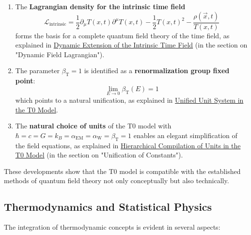 \documentclass[12pt,a4paper]{article}
\newcommand{\Tfieldt}{T(x,t)}
\newcommand{\alphaEM}{\alpha_{\text{EM}}}
\newcommand{\alphaW}{\alpha_{\text{W}}}
\newcommand{\betaT}{\beta_{\text{T}}}
\newcommand{\vecx}{\vec{x}}
\begin{document}
	\begin{enumerate}
		\item The \textbf{Lagrangian density for the intrinsic time field}
		\begin{equation}
			\mathcal{L}_{\text{intrinsic}} = \frac{1}{2}\partial_{\mu}\Tfieldt\partial^{\mu}\Tfieldt - \frac{1}{2}\Tfieldt^2 - \frac{\rho(\vecx,t)}{\Tfieldt}
		\end{equation}
		forms the basis for a complete quantum field theory of the time field, as explained in \href{https://github.com/jpascher/T0-Time-Mass-Duality/tree/main/2/pdf/English/DynamicTF-SchrodingerExtensions_En.pdf}{Dynamic Extension of the Intrinsic Time Field} (in the section on "Dynamic Field Lagrangian").
		
		\item The parameter $\betaT = 1$ is identified as a \textbf{renormalization group fixed point}:
		\begin{equation}
			\lim_{E \to 0} \betaT(E) = 1
		\end{equation}
		which points to a natural unification, as explained in \href{https://github.com/jpascher/T0-Time-Mass-Duality/tree/main/2/pdf/English/Alpha1Beta1KonsistenzEn.pdf}{Unified Unit System in the T0 Model}.
		
		\item The \textbf{natural choice of units} of the T0 model with $\hbar = c = G = k_B = \alphaEM = \alphaW = \betaT = 1$ enables an elegant simplification of the field equations, as explained in \href{https://github.com/jpascher/T0-Time-Mass-Duality/tree/main/2/pdf/English/NatEinheitenSystematikEn.pdf}{Hierarchical Compilation of Units in the T0 Model} (in the section on "Unification of Constants").
	\end{enumerate}
	
	These developments show that the T0 model is compatible with the established methods of quantum field theory not only conceptually but also technically.
	
	\subsection{Thermodynamics and Statistical Physics}
	\label{subsec:thermodynamics}
	
	The integration of thermodynamic concepts is evident in several aspects:
	
\end{document}
